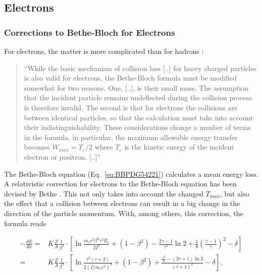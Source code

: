 \newpage

\subsection{Electrons} 
\label{subsection:electrons}

\subsubsection{Corrections to Bethe-Bloch for Electrons}
\hspace*{\parindent}

For electrons, the matter is more complicated than for hadrons \cite{leo}:

\begin{quote}
``While the basic mechanism of collision loss [..] for heavy charged particles is
also valid for electrons, the Bethe-Bloch formula must be modified somewhat for
two reasons. One, [..], is their small mass. The assumption that the incident
particle remains undeflected during the collision process is therefore invalid.
The second is that for electrons the collisions are between identical particles,
so that the calculation must take into account their indistinguishability. These
considerations change a number of terms in the formula, in particular, the maximum
allowable energy transfer becomes $W_{max}=T_e/2$ where $T_e$ is the kinetic energy
of the incident electron or positron. [..]''
\end{quote}

The Bethe-Bloch equation (Eq.~\ref{eq:BBPDG54221}) calculates a mean energy loss.
A relativistic correction for electrons to the Bethe-Bloch equation has been devised
by Bethe \cite{leo,musiol}. This not only takes into account the changed $T_{max}$, but
also the effect that a collision between electrons can result in a big change in the
direction of the particle momentum. With, among others, this correction, the formula 
reads

\begin{eqnarray}
\label{eq:bethemusiol}
-\frac{dE}{dx} = & K \frac{Z}{A} \frac{1}{\beta^2} \cdot 
  \left[
	\ln{\frac{m_e c^2 \beta^2 \gamma^2 E_e}{2 I^2}} + (1-\beta^2) 
 	- \frac{2\gamma-1}{\gamma^2} \ln{2} + \frac{1}{8}\left( 
 		\frac{\gamma-1}{\gamma}
	\right)^2 - \delta
  \right] \\
\label{eq:bethe}
 = & K \frac{Z}{A} \frac{1}{\beta^2} \cdot 
  \left[
   	\ln{\frac{\tau^2(\tau+2)}{2(I/m_e c^2)^2}}
        +(1-\beta^2)+\frac{\frac{\tau^2}{8}-(2\tau+1)\ln{2}}{(\tau+1)^2} 
	- \delta
  \right],
\end{eqnarray}
 
